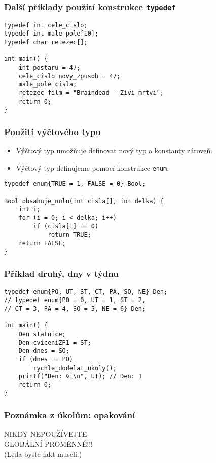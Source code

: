 \documentclass{beamer}
\newenvironment{itemizex}%
  {\large \begin{itemize}%
    \setlength{\itemsep}{8pt}%
    \setlength{\parskip}{8pt}}%
  {\end{itemize}}
\begin{document}
\begin{frame}[t,fragile]\frametitle{Další příklady použití konstrukce \texttt{typedef}} 
\begin{verbatim} 
typedef int cele_cislo; 
typedef int male_pole[10]; 
typedef char retezec[];

int main() {
    int postaru = 47;
    cele_cislo novy_zpusob = 47;
    male_pole cisla;
    retezec film = "Braindead - Zivi mrtvi";
    return 0;     
}
\end{verbatim}
\end{frame}



\begin{frame}[t,fragile]\frametitle{Použití výčtového typu} 
    \begin{itemizex}
        \item Výčtový typ umožňuje definovat nový typ a konstanty zároveň.
        \item Výčtový typ definujeme pomocí konstrukce \texttt{enum}.
    \end{itemizex}
\begin{verbatim} 
typedef enum{TRUE = 1, FALSE = 0} Bool;

Bool obsahuje_nulu(int cisla[], int delka) {
    int i;
    for (i = 0; i < delka; i++)
        if (cisla[i] == 0) 
            return TRUE;
    return FALSE;
}
\end{verbatim}
\end{frame}


\begin{frame}[t,fragile]\frametitle{Příklad druhý, dny v týdnu} 
\begin{verbatim} 
typedef enum{PO, UT, ST, CT, PA, SO, NE} Den;
// typedef enum{PO = 0, UT = 1, ST = 2, 
// CT = 3, PA = 4, SO = 5, NE = 6} Den;

int main() {
    Den statnice;
    Den cviceniZP1 = ST;
    Den dnes = SO;
    if (dnes == PO) 
        rychle_dodelat_ukoly();
    printf("Den: %i\n", UT); // Den: 1
    return 0;     
}
\end{verbatim}
\end{frame}


\begin{frame}[t,fragile]\frametitle{Poznámka z úkolům: opakování} 
\begin{center}
\vskip 1cm
{\LARGE NIKDY NEPOUŽÍVEJTE\\
\vskip 5mm 
GLOBÁLNÍ PROMĚNNÉ!!!
}
\\
\vskip 1cm
{\small (Leda byste fakt museli.)}
\end{center}
\end{frame}
\end{document}
